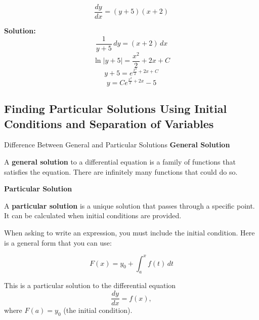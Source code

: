 \documentclass[12pt]{article}
\theoremstyle{beautifulthm}
\begin{document}
\begin{tcolorbox}[colback=examplebg, colframe=red!75!black, title=\textbf{EXAMPLE 4: Solved Differential Equations}, fonttitle=\bfseries, sharp corners]

\[
\frac{dy}{dx} = (y+5)(x+2)
\]

\tcblower
\textbf{Solution:} 
\[
\frac{1}{y+5} \, dy = (x+2) \, dx
\]
\[
\ln|y+5| = \frac{x^2}{2} + 2x + C
\]
\[
y+5 = e^{\frac{x^2}{2} + 2x + C}
\]
\[
y = Ce^{\frac{x^2}{2} + 2x} - 5
\]

\end{tcolorbox}

\newpage

\subsection{Finding Particular Solutions Using Initial Conditions and Separation of Variables}

\begin{Note}{Difference Between General and Particular Solutions}{}
    \textbf{General Solution}

\vspace{1mm}
    
A \textbf{general solution} to a differential equation is a family of functions that satisfies the equation. There are infinitely many functions that could do so.


\vspace{5mm}


\textbf{Particular Solution}

\vspace{1mm}

A \textbf{particular solution} is a unique solution that passes through a specific point. It can be calculated when initial conditions are provided.
\end{Note}


When asking to write an expression, you must include the initial condition. Here is a general form that you can use:

\[
F(x) = y_0 + \int_a^x f(t) \, dt
\]

This is a particular solution to the differential equation 
\[
\frac{dy}{dx} = f(x),
\]
where $F(a) = y_0$ (the initial condition).
\end{document}
